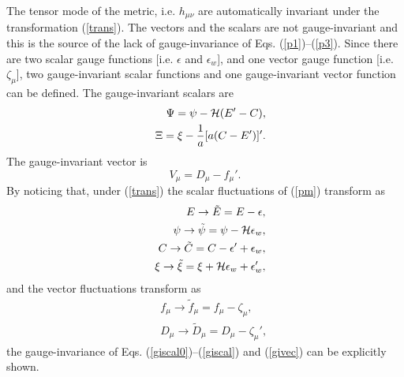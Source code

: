 \documentclass[a4paper,12pt]{article}
\begin{document}
The tensor mode of the metric, i.e.
$h_{\mu\nu}$ are automatically invariant under the transformation 
(\ref{trans}).  The vectors and the scalars are not gauge-invariant and this 
is the source of the lack of gauge-invariance of Eqs. (\ref{p1})--(\ref{p3}).
Since there are two scalar gauge functions  [i.e. 
$\epsilon$ and $\epsilon_{w}$],
and one vector gauge function [i.e. $\zeta_{\mu}$], two
gauge-invariant scalar functions and one gauge-invariant vector function
can be defined. The gauge-invariant scalars are
\begin{eqnarray}
&&\Psi = \psi - {\cal H}  ( E' - C), 
\label{giscal0}\\
&& \Xi = \xi - \frac{1}{a} [ a( C - E')]'.
\label{giscal}
\end{eqnarray}
The gauge-invariant vector is
\begin{equation}
V_{\mu} = D_{\mu} - f_{\mu}'.
\label{givec}
\end{equation}
By noticing that, under (\ref{trans}) the scalar fluctuations of 
(\ref{pm}) transform as 
\begin{eqnarray}
&&E\to\tilde{E} = E - \epsilon,
\label{El}\\
&&\psi\to \tilde{\psi} = \psi - {\cal H} \epsilon_{w},
\label{psil}\\
&& C\to\tilde{C} = C - \epsilon' + \epsilon_{w},
\label{Cl}\\
&& \xi\to \tilde{\xi} = \xi + {\cal H} \epsilon_{w} + \epsilon_{w}',
\label{xil}
\end{eqnarray}
and the vector fluctuations transform as 
\begin{eqnarray}
&& f_{\mu}\to \tilde{f}_{\mu} = f_{\mu} - \zeta_{\mu},
\label{fl}\\
&& D_{\mu}\to \tilde{D}_{\mu} = D_{\mu} - \zeta_{\mu}',
\label{zeta}
\end{eqnarray}
the gauge-invariance of Eqs. (\ref{giscal0})--(\ref{giscal})  
and (\ref{givec}) can be explicitly shown.
\end{document}
